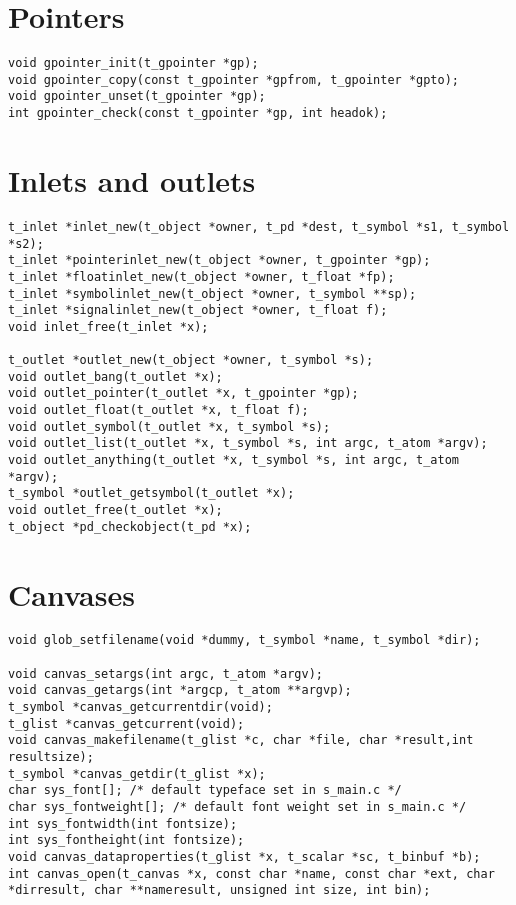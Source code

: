 \section{Pointers}
\begin{lstlisting}
void gpointer_init(t_gpointer *gp);
void gpointer_copy(const t_gpointer *gpfrom, t_gpointer *gpto);
void gpointer_unset(t_gpointer *gp);
int gpointer_check(const t_gpointer *gp, int headok);
\end{lstlisting}

\section{Inlets and outlets}
\begin{lstlisting}
t_inlet *inlet_new(t_object *owner, t_pd *dest, t_symbol *s1, t_symbol *s2);
t_inlet *pointerinlet_new(t_object *owner, t_gpointer *gp);
t_inlet *floatinlet_new(t_object *owner, t_float *fp);
t_inlet *symbolinlet_new(t_object *owner, t_symbol **sp);
t_inlet *signalinlet_new(t_object *owner, t_float f);
void inlet_free(t_inlet *x);

t_outlet *outlet_new(t_object *owner, t_symbol *s);
void outlet_bang(t_outlet *x);
void outlet_pointer(t_outlet *x, t_gpointer *gp);
void outlet_float(t_outlet *x, t_float f);
void outlet_symbol(t_outlet *x, t_symbol *s);
void outlet_list(t_outlet *x, t_symbol *s, int argc, t_atom *argv);
void outlet_anything(t_outlet *x, t_symbol *s, int argc, t_atom *argv);
t_symbol *outlet_getsymbol(t_outlet *x);
void outlet_free(t_outlet *x);
t_object *pd_checkobject(t_pd *x);
\end{lstlisting}

\section{Canvases}
\begin{lstlisting}
void glob_setfilename(void *dummy, t_symbol *name, t_symbol *dir);

void canvas_setargs(int argc, t_atom *argv);
void canvas_getargs(int *argcp, t_atom **argvp);
t_symbol *canvas_getcurrentdir(void);
t_glist *canvas_getcurrent(void);
void canvas_makefilename(t_glist *c, char *file, char *result,int resultsize);
t_symbol *canvas_getdir(t_glist *x);
char sys_font[]; /* default typeface set in s_main.c */
char sys_fontweight[]; /* default font weight set in s_main.c */
int sys_fontwidth(int fontsize);
int sys_fontheight(int fontsize);
void canvas_dataproperties(t_glist *x, t_scalar *sc, t_binbuf *b);
int canvas_open(t_canvas *x, const char *name, const char *ext, char *dirresult, char **nameresult, unsigned int size, int bin);
\end{lstlisting}

